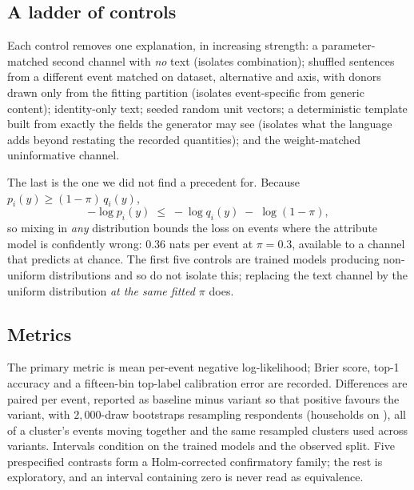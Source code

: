 \subsection{A ladder of controls}
\label{sec:controls}

Each control removes one explanation, in increasing strength: a parameter-matched second
channel with \emph{no} text (isolates combination); shuffled sentences from a different event
matched on dataset, alternative and axis, with donors drawn only from the fitting partition
(isolates event-specific from generic content); identity-only text; seeded random unit
vectors; a deterministic template built from exactly the fields the generator may see
(isolates what the language adds beyond restating the recorded quantities); and the
weight-matched uninformative channel.

The last is the one we did not find a precedent for. Because
$p_i(y) \geq (1-\pi)\, q_i(y)$,
\begin{equation}
-\log p_i(y) \;\leq\; -\log q_i(y) \;-\; \log(1-\pi),
\label{eq:floor}
\end{equation}
so mixing in \emph{any} distribution bounds the loss on events where the attribute model is
confidently wrong: $0.36$ nats per event at $\pi = 0.3$, available to a channel that predicts
at chance. The first five controls are trained models producing non-uniform distributions and
so do not isolate this; replacing the text channel by the uniform distribution \emph{at the
same fitted $\pi$} does.

\subsection{Metrics}

The primary metric is mean per-event negative log-likelihood; Brier score, top-1 accuracy and
a fifteen-bin top-label calibration error are recorded. Differences are paired per event,
reported as baseline minus variant so that positive favours the variant, with $2{,}000$-draw
bootstraps resampling respondents (households on ), all of a cluster's events
moving together and the same resampled clusters used across variants. Intervals condition on
the trained models and the observed split. Five prespecified contrasts form a Holm-corrected
confirmatory family; the rest is exploratory, and an interval containing zero is never read as
equivalence.
